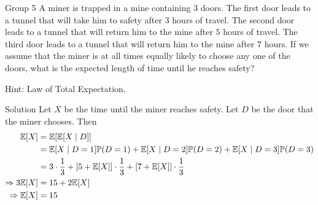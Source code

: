 \documentclass{article}
\begin{document}
\begin{problem}
    {Group 5}
    A miner is trapped in a mine containing $3$ doors. The first door leads to a tunnel that will take him to safety after $3$ hours of travel. The second door leads to a tunnel that will return him to the mine after $5$ hours of travel. The third door leads to a tunnel that will return him to the mine after $7$ hours. If we assume that the miner is at all times equally likely to choose any one of the doors, what is the expected length of time until he reaches safety?
    \begin{solution}
        {Hint:}
        Law of Total Expectation.
    \end{solution}
\end{problem}

\begin{solution}
    {Solution}
    Let $X$ be the time until the miner reaches safety. Let $D$ be the door that the miner chooses. Then
    \begin{align*}
        \E{X} &= \E{\condE{X}{D}} \\
        &= \E{X\mid D=1}\P{D=1}+\E{X\mid D=2}\P{D=2}+\E{X\mid D=3}\P{D=3} \\
        &= 3\cdot\frac{1}{3}+[5+\E{X}]\cdot\frac{1}{3}+[7+\E{X}]\cdot\frac{1}{3} \\
        \Rightarrow
        3\E{X} &= 15 + 2\E{X} \\
        \Rightarrow
        \E{X} &= 15
    \end{align*}

\end{solution}
\end{document}
